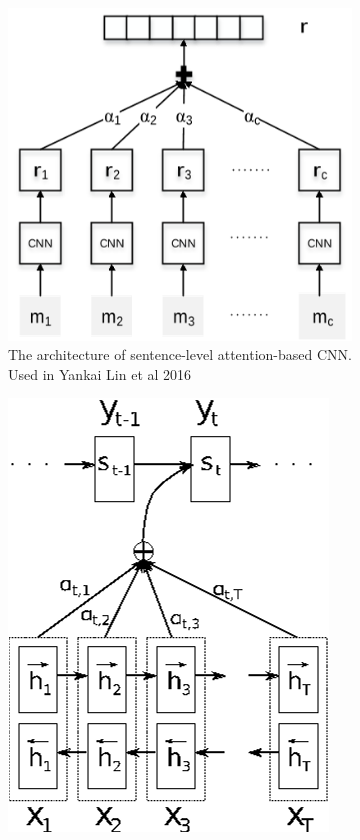 \documentclass{article}
\begin{document}
	\begin{figure}[h!]
		\centering
		\begin{subfigure}[b]{0.4\linewidth}
			\includegraphics[width=\linewidth]{figure1.png}
			\caption{The architecture of sentence-level attention-based CNN. Used in Yankai Lin et al 2016}
		\end{subfigure}
		\begin{subfigure}[b]{0.4\linewidth}
			\includegraphics[width=\linewidth]{attention-method-1.png}

\end{subfigure}
\end{figure}
\end{document}
